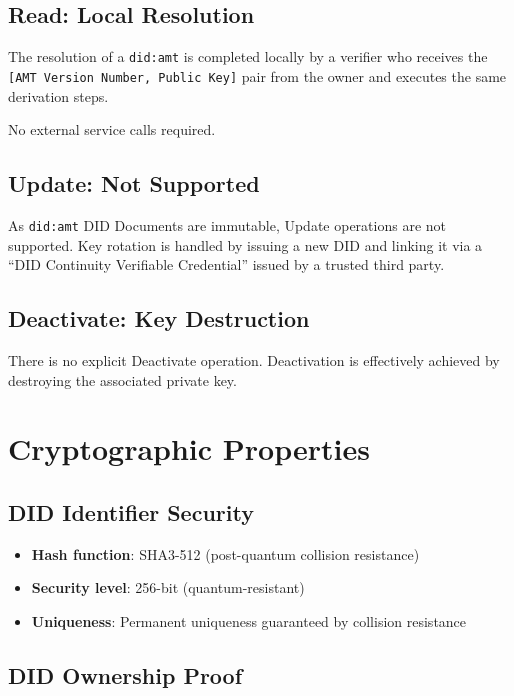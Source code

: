 \subsection{Read: Local Resolution}

The resolution of a \texttt{did:amt} is completed locally by a verifier who receives the \texttt{[AMT Version Number, Public Key]} pair from the owner and executes the same derivation steps.

No external service calls required.

\subsection{Update: Not Supported}

As \texttt{did:amt} DID Documents are immutable, Update operations are not supported. Key rotation is handled by issuing a new DID and linking it via a ``DID Continuity Verifiable Credential'' issued by a trusted third party.

\subsection{Deactivate: Key Destruction}

There is no explicit Deactivate operation. Deactivation is effectively achieved by destroying the associated private key.

\section{Cryptographic Properties}

\subsection{DID Identifier Security}

\begin{itemize}
  \item \textbf{Hash function}: SHA3-512 (post-quantum collision resistance)
  \item \textbf{Security level}: 256-bit (quantum-resistant)
  \item \textbf{Uniqueness}: Permanent uniqueness guaranteed by collision resistance
\end{itemize}

\subsection{DID Ownership Proof}

